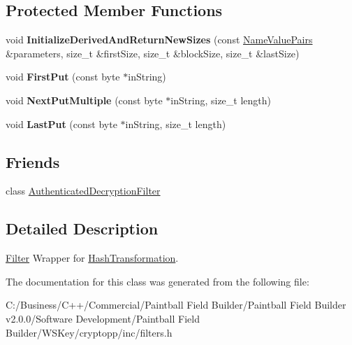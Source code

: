 \subsection*{Protected Member Functions}
\begin{DoxyCompactItemize}
\item 
\hypertarget{class_hash_verification_filter_a576bff69d1916d93006b36c8f08b34fc}{
void {\bfseries InitializeDerivedAndReturnNewSizes} (const \hyperlink{class_name_value_pairs}{NameValuePairs} \&parameters, size\_\-t \&firstSize, size\_\-t \&blockSize, size\_\-t \&lastSize)}
\label{class_hash_verification_filter_a576bff69d1916d93006b36c8f08b34fc}

\item 
\hypertarget{class_hash_verification_filter_ad9a36a03b47bab184ad1249f5c1cdcdb}{
void {\bfseries FirstPut} (const byte $\ast$inString)}
\label{class_hash_verification_filter_ad9a36a03b47bab184ad1249f5c1cdcdb}

\item 
\hypertarget{class_hash_verification_filter_a28f02b077e729c44d98c90fad796be3a}{
void {\bfseries NextPutMultiple} (const byte $\ast$inString, size\_\-t length)}
\label{class_hash_verification_filter_a28f02b077e729c44d98c90fad796be3a}

\item 
\hypertarget{class_hash_verification_filter_a340b6ef7bfde4862af4f1ebec217e269}{
void {\bfseries LastPut} (const byte $\ast$inString, size\_\-t length)}
\label{class_hash_verification_filter_a340b6ef7bfde4862af4f1ebec217e269}

\end{DoxyCompactItemize}
\subsection*{Friends}
\begin{DoxyCompactItemize}
\item 
\hypertarget{class_hash_verification_filter_a8ee49fc7dbd09e4c04ce8f0b2e874c9d}{
class \hyperlink{class_hash_verification_filter_a8ee49fc7dbd09e4c04ce8f0b2e874c9d}{AuthenticatedDecryptionFilter}}
\label{class_hash_verification_filter_a8ee49fc7dbd09e4c04ce8f0b2e874c9d}

\end{DoxyCompactItemize}


\subsection{Detailed Description}
\hyperlink{class_filter}{Filter} Wrapper for \hyperlink{class_hash_transformation}{HashTransformation}. 

The documentation for this class was generated from the following file:\begin{DoxyCompactItemize}
\item 
C:/Business/C++/Commercial/Paintball Field Builder/Paintball Field Builder v2.0.0/Software Development/Paintball Field Builder/WSKey/cryptopp/inc/filters.h\end{DoxyCompactItemize}
